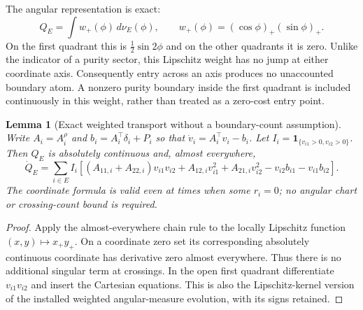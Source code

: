 \documentclass{article} %
\theoremstyle{plain}
\newtheorem{lemma}[theorem]{Lemma}
\theoremstyle{definition}
\theoremstyle{remark}
\begin{document}
The angular representation is exact:
\[
 Q_E=\int w_+(\phi)\,d\nu_E(\phi),\qquad
 w_+(\phi)=(\cos\phi)_+(\sin\phi)_+.
\]
On the first quadrant this is $\tfrac12\sin2\phi$ and on the other
quadrants it is zero. Unlike the indicator of a purity sector, this
Lipschitz weight has no jump at either coordinate axis. Consequently
entry across an axis produces no unaccounted boundary atom. A nonzero
purity boundary inside the first quadrant is included continuously in
this weight, rather than treated as a zero-cost entry point.

\begin{lemma}[Exact weighted transport without a boundary-count assumption]
\label{sbflux:transport}
Write $A_i=A_i^\rho$ and $b_i=A_i^\top\delta_i+P_i$ so that
$\dot v_i=A_i^\top v_i-b_i$.
Let $I_i=\mathbf1_{\{v_{i1}>0,v_{i2}>0\}}$.
Then $Q_E$ is absolutely continuous and, almost everywhere,
\begin{equation}\label{sbflux:transport-exact}
 \dot Q_E=\sum_{i\in E}I_i\left[
 (A_{11,i}+A_{22,i})v_{i1}v_{i2}
 +A_{12,i}v_{i1}^2+A_{21,i}v_{i2}^2
 -v_{i2}b_{i1}-v_{i1}b_{i2}\right].
\end{equation}
The coordinate formula is valid even at times when some $r_i=0$; no
angular chart or crossing-count bound is required.
\end{lemma}
\begin{proof}
Apply the almost-everywhere chain rule to the locally Lipschitz function
$(x,y)\mapsto x_+y_+$. On a coordinate zero set its corresponding
absolutely continuous coordinate has derivative zero almost everywhere.
Thus there is no additional singular term at crossings. In the open first
quadrant differentiate $v_{i1}v_{i2}$ and insert the Cartesian equations.
This is also the Lipschitz-kernel version of the installed weighted
angular-measure evolution, with its signs retained.
\end{proof}
\end{document}
